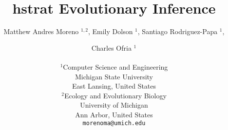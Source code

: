 \title{ hstrat Evolutionary Inference }

\author{
Matthew Andres Moreno
$^{1, 2}$,
Emily Dolson
$^{1}$,
Santiago Rodriguez-Papa
$^{1}$,
\and Charles Ofria
$^{1}$ \\
\mbox{}\\
$^1$Computer Science and Engineering \\
Michigan State University \\
East Lansing, United States \\
$^2$Ecology and Evolutionary Biology \\
University of Michigan \\
Ann Arbor, United States \\
\texttt{morenoma@umich.edu}
}

\maketitle
